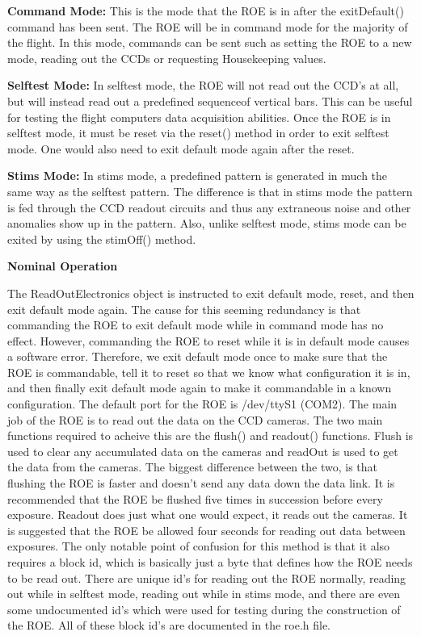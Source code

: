 \textbf{Command Mode:}
This is the mode that the ROE is in after the exitDefault() command has been sent. The ROE will be in command mode for the majority of the flight. In this mode, commands can be sent such as setting the ROE to a new mode, reading out the CCDs or requesting Housekeeping values. 

\textbf{Selftest Mode:}
In selftest mode, the ROE will not read out the CCD’s at all, but will instead read out a predefined sequenceof vertical bars. This can be useful for testing the flight computers data acquisition abilities. Once the ROE is in selftest mode, it must be reset via the reset() method in order to exit selftest mode. One would also need to exit default mode again after the reset.

\textbf{Stims Mode:}
In stims mode,  a predefined pattern is generated in much the same way as the selftest pattern. The difference is that in stims mode the pattern is fed through the CCD readout circuits and thus any extraneous noise and other anomalies show up in the pattern. Also, unlike selftest mode, stims mode can be exited by using the stimOff() method.

\textbf{Nominal Operation}

The ReadOutElectronics object is instructed to exit default mode, reset, and then exit default mode again. The cause for this seeming redundancy is that commanding the ROE to exit default mode while in command mode has no effect. However, commanding the ROE to reset while it is in default mode causes a software error. Therefore, we exit default mode once to make sure that the ROE is commandable, tell it to reset so that we know what configuration it is in, and then finally exit default mode again to make it commandable in a known configuration. The default port for the ROE is /dev/ttyS1 (COM2).
The main job of the ROE is to read out the data on the CCD cameras. The two main functions required to acheive this are the flush() and readout() functions. Flush is used to clear any accumulated data on the cameras and readOut is used to get the data from the cameras. The biggest difference between the two, is that flushing the ROE is faster and doesn’t send any data down the data link. It is recommended that the ROE be flushed five times in succession before every exposure. Readout does just what one would expect, it reads out the cameras. It is suggested that the ROE be allowed four seconds for reading out data between exposures. The only notable point of confusion for this method is that it also requires a block id, which is basically just a byte that defines how the ROE needs to be read out. There are unique id’s for reading out the ROE normally, reading out while in selftest mode, reading out while in stims mode, and there are even some undocumented id’s which were used for testing during the construction of the ROE. All of these block id’s are documented in the roe.h file.

